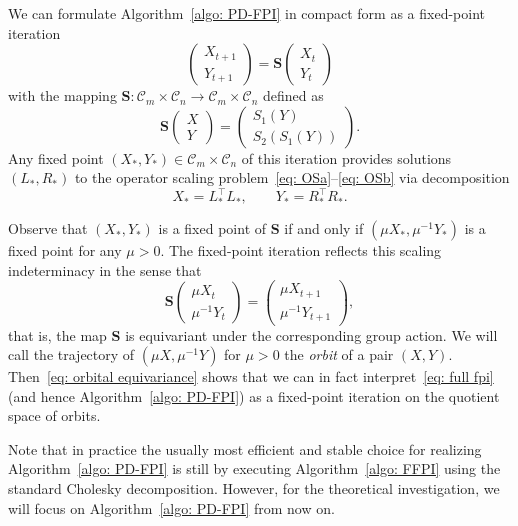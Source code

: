 \documentclass[a4paper]{article}
\newcommand{\bS}{\mathbf{S}}
\newcommand{\caC}{\mathcal{C}}
\theoremstyle{definition}
\numberwithin{equation}{section}
\begin{document}
We can formulate Algorithm~\ref{algo: PD-FPI} in compact form as a fixed-point iteration
\begin{equation}\label{eq: full fpi}
 \begin{pmatrix} X_{t+1} \\ Y_{t+1} \end{pmatrix} = \bS\!\begin{pmatrix} X_t \\ Y_t \end{pmatrix}
\end{equation}
with the mapping $\bS : \caC_m \times \caC_n \to \caC_m \times \caC_n$ defined as
\begin{equation}\label{eq: fixed-point map}
\bS\!\begin{pmatrix} X \\ Y \end{pmatrix} = \begin{pmatrix} S_1(Y) \\ S_2(S_1(Y)) \end{pmatrix}.
\end{equation}
Any fixed point $(X_*,Y_*) \in \caC_m \times \caC_n$ of this iteration provides solutions $(L_*,R_*)$ to the operator scaling problem~\eqref{eq: OSa}--\eqref{eq: OSb} via decomposition
\[
 X_* = L_*^\top L_*^{}, \qquad Y_* = R_*^\top R_*^{}.
\]

Observe that $(X_*,Y_*)$ is a fixed point of $\bS$ if and only if $(\mu X_*, \mu^{-1} Y_*)$ is a fixed point for any $\mu > 0$. The fixed-point iteration reflects this scaling indeterminacy in the sense that 
\begin{equation}\label{eq: orbital equivariance}
\bS\!\begin{pmatrix} \mu X_t \\ \mu^{-1} Y_t \end{pmatrix} = \begin{pmatrix} \mu X_{t+1} \\ \mu^{-1} Y_{t+1} \end{pmatrix},
\end{equation}
that is, the map $\bS$ is equivariant under the corresponding group action. We will call the trajectory of $(\mu X, \mu^{-1} Y)$ for $\mu > 0$ the \emph{orbit} of a pair $(X,Y)$. Then~\eqref{eq: orbital equivariance} shows that we can in fact interpret~\eqref{eq: full fpi} (and hence Algorithm~\ref{algo: PD-FPI}) as a fixed-point iteration on the quotient space of orbits.

Note that in practice the usually most efficient and stable choice for realizing Algorithm~\ref{algo: PD-FPI} is still by executing Algorithm~\ref{algo: FFPI} using the standard Cholesky decomposition. However, for the theoretical investigation, we will focus on Algorithm~\ref{algo: PD-FPI} from now on.
\end{document}
